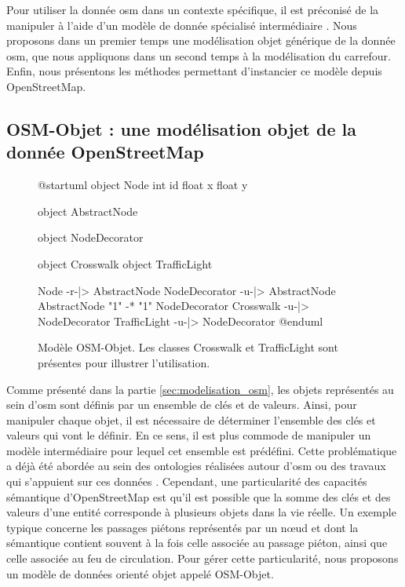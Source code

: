 Pour utiliser la donnée \gls{osm} dans un contexte spécifique, il est préconisé de la manipuler à l'aide d'un modèle de donnée spécialisé intermédiaire \cite{Touya2014}. Nous proposons dans un premier temps une modélisation objet générique de la donnée \gls{osm}, que nous appliquons dans un second temps à la modélisation du carrefour. Enfin, nous présentons les méthodes permettant d'instancier ce modèle depuis OpenStreetMap.

\subsection{OSM-Objet : une modélisation objet de la donnée OpenStreetMap}

\begin{figure}
\centering
\begin{plantuml}

    @startuml
    object Node {
        int id
        float x
        float y
    }

    object AbstractNode

    object NodeDecorator

    object Crosswalk
    object TrafficLight

    Node -r-|> AbstractNode
    NodeDecorator -u-|> AbstractNode
    AbstractNode "1" -* "1" NodeDecorator
    Crosswalk -u-|> NodeDecorator
    TrafficLight -u-|> NodeDecorator
    @enduml
    
\end{plantuml}
\caption[Modèle OSM-Objet.]{Modèle OSM-Objet. Les classes Crosswalk et TrafficLight sont présentes pour illustrer l'utilisation.}
\label{fig:modelisation_osm_objet}
\end{figure}

Comme présenté dans la partie \ref{sec:modelisation_osm}, les objets représentés au sein d'\gls{osm} sont définis par un ensemble de clés et de valeurs. Ainsi, pour manipuler chaque objet, il est nécessaire de déterminer l'ensemble des clés et valeurs qui vont le définir. En ce sens, il est plus commode de manipuler un modèle intermédiaire pour lequel cet ensemble est prédéfini. Cette problématique a déjà été abordée au sein des ontologies réalisées autour d'\gls{osm}\cite{Codescu2011,Hombiat2017} ou des travaux qui s'appuient sur ces données \cite{Touya2014}. Cependant, une particularité des capacités sémantique d'OpenStreetMap est qu'il est possible que la somme des clés et des valeurs d'une entité corresponde à plusieurs objets dans la vie réelle. Un exemple typique concerne les passages piétons représentés par un nœud et dont la sémantique contient souvent à la fois celle associée au passage piéton, ainsi que celle associée au feu de circulation. Pour gérer cette particularité, nous proposons un modèle de données orienté objet appelé OSM-Objet.

